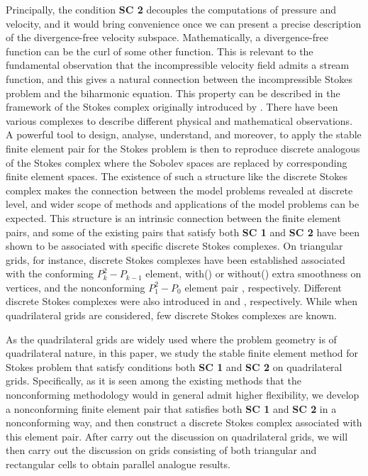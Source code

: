 \documentclass[12pt,showkeys]{amsart}
\begin{document}
Principally, the condition \textbf{SC 2} decouples the computations of pressure and velocity, and it would bring convenience once we can present a precise description of the divergence-free velocity subspace. Mathematically, a divergence-free function can be the curl of some other function\cite{Girault.V;Raviart.P}. This is relevant to the fundamental observation that the incompressible velocity field admits a stream function, and this gives a natural connection between the incompressible Stokes problem and the biharmonic equation. This property can be described in the framework of the Stokes complex originally introduced by \cite{Mardal.K;Tai.X;Winther.R2002,Tai.X;Winther.R2006}. There have been various complexes to describe different physical and mathematical observations\cite{Arnold.D;Falk.R;Winther.R2006m,Arnold.D;Falk.R;Winther.R2006}. A powerful tool to design, analyse, understand, and moreover, to apply the stable finite element pair for the Stokes problem is then to reproduce discrete analogous of the Stokes complex where the Sobolev spaces are replaced by corresponding finite element spaces. The existence of such a structure like the discrete Stokes complex makes the connection between the model problems revealed at discrete level, and wider scope of methods and applications of the model problems can be expected. This structure is an intrinsic connection between the finite element pairs, and some of the existing pairs that satisfy both \textbf{SC 1} and \textbf{SC 2} have been shown to be associated with specific discrete Stokes complexes. On triangular grids, for instance, discrete Stokes complexes have been established associated with the conforming $P_k^2-P_{k-1}$ element, with(\cite{Guzman.J;Neilan.M}) or without(\cite{Scott.L;Vogelius.M1985}) extra smoothness on vertices, and the nonconforming $P_1^2-P_0$ element pair \cite{Falk.R;Morley.E1990}, respectively. Different discrete Stokes complexes were also introduced in \cite{Mardal.K;Tai.X;Winther.R2002} and \cite{Guzman.J;Neilan.M}, respectively. While when quadrilateral grids are considered, few discrete Stokes complexes are known.

As the quadrilateral grids are widely used where the problem geometry is of quadrilateral nature, in this paper, we study the stable finite element method for Stokes problem that satisfy conditions both \textbf{SC 1} and \textbf{SC 2} on quadrilateral grids. Specifically, as it is seen among the existing methods that the nonconforming methodology would in general admit higher flexibility, we develop a nonconforming finite element pair that satisfies both \textbf{SC 1} and \textbf{SC 2} in a nonconforming way, and then construct a discrete Stokes complex associated with this element pair.  After carry out the discussion on quadrilateral grids, we will then carry out the discussion on grids consisting of both triangular and rectangular cells to obtain parallel analogue results.
\end{document}
